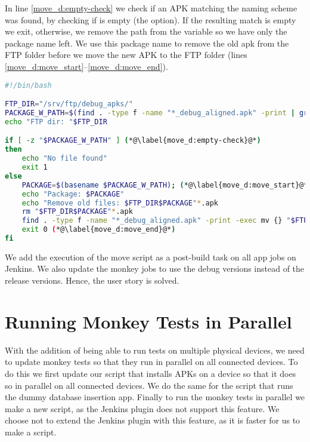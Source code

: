 In line \ref{move_d:empty-check} we check if an APK matching the naming scheme was found, by checking if  is empty (the  option). If the resulting match is empty we exit, otherwise, we remove the path from the variable  so we have only the package name left. We use this package name to remove the old apk from the FTP folder before we move the new APK to the FTP folder (lines \ref{move_d:move_start}--\ref{move_d:move_end}).

\begin{lstlisting}[language=bash,showstringspaces=false,caption=Script that moves the debug APK to the ftp server,label=lst:move_debug_apk]
#!/bin/bash

FTP_DIR="/srv/ftp/debug_apks/"
PACKAGE_W_PATH=$(find . -type f -name "*_debug_aligned.apk" -print | grep ".+(?=_v.+b[0-9]+_debug_aligned\.apk)" -Po) (*@\label{move_d:package}@*)
echo "FTP dir: "$FTP_DIR

if [ -z "$PACKAGE_W_PATH" ] (*@\label{move_d:empty-check}@*)
then
    echo "No file found"
    exit 1
else
    PACKAGE=$(basename $PACKAGE_W_PATH); (*@\label{move_d:move_start}@*)
    echo "Package: $PACKAGE"
    echo "Remove old files: $FTP_DIR$PACKAGE"*.apk
    rm "$FTP_DIR$PACKAGE"*.apk
    find . -type f -name "*_debug_aligned.apk" -print -exec mv {} "$FTP_DIR" \;
    exit 0 (*@\label{move_d:move_end}@*)
fi
\end{lstlisting}

We add the execution of the move script as a post-build task on all app jobs on Jenkins. We also update the monkey jobs to use the debug versions instead of the release versions. Hence, the user story is solved.

\section{Running Monkey Tests in Parallel}
With the addition of being able to run tests on multiple physical devices, we need to update monkey tests so that they run in parallel on all connected devices. To do this we first update our script that installs APKs on a device so that it does so in parallel on all connected devices. We do the same for the script that runs the dummy database insertion app. Finally to run the monkey tests in parallel we make a new script, as the Jenkins plugin does not support this feature. We choose not to extend the Jenkins plugin with this feature, as it is faster for us to make a script.

